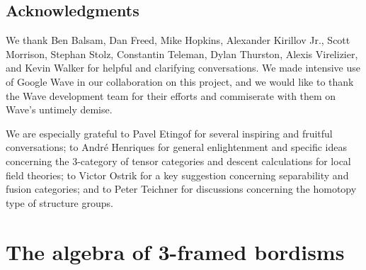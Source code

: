 \documentclass{amsart}
\begin{document}
\subsection*{Acknowledgments}

We thank Ben Balsam, Dan Freed, Mike Hopkins, Alexander Kirillov Jr., Scott Morrison, Stephan Stolz, Constantin Teleman, Dylan Thurston, Alexis Virelizier, and Kevin Walker for helpful and clarifying conversations.  We made intensive use of Google Wave in our collaboration on this project, and we would like to thank the Wave development team for their efforts and commiserate with them on Wave's untimely demise.

We are especially grateful to Pavel Etingof for several inspiring and fruitful conversations; to Andr\'e Henriques for general enlightenment and specific ideas concerning the 3-category of tensor categories and descent calculations for local field theories; to Victor Ostrik for a key suggestion concerning separability and fusion categories; and to Peter Teichner for discussions concerning the homotopy type of structure groups.







\section{The algebra of 3-framed bordisms} \label{sec:lft}
\end{document}
